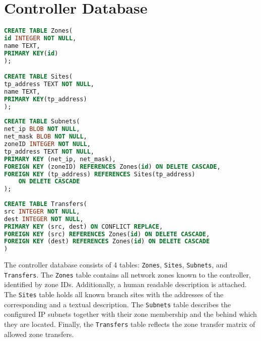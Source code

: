 \chapter{Controller Database}
\label{apdx:controllerdb}


\begin{lstlisting}[language=sql, basicstyle=\footnotesize,
]
CREATE TABLE Zones(
id INTEGER NOT NULL,
name TEXT,
PRIMARY KEY(id)
);

CREATE TABLE Sites(
tp_address TEXT NOT NULL,
name TEXT,
PRIMARY KEY(tp_address)
);
	  
CREATE TABLE Subnets(
net_ip BLOB NOT NULL,
net_mask BLOB NOT NULL,
zoneID INTEGER NOT NULL,
tp_address TEXT NOT NULL,
PRIMARY KEY (net_ip, net_mask),
FOREIGN KEY (zoneID) REFERENCES Zones(id) ON DELETE CASCADE,
FOREIGN KEY (tp_address) REFERENCES Sites(tp_address)
	ON DELETE CASCADE
);
	  
CREATE TABLE Transfers(
src INTEGER NOT NULL,
dest INTEGER NOT NULL,
PRIMARY KEY (src, dest) ON CONFLICT REPLACE,
FOREIGN KEY (src) REFERENCES Zones(id) ON DELETE CASCADE,
FOREIGN KEY (dest) REFERENCES Zones(id) ON DELETE CASCADE	
)
\end{lstlisting}

The controller database consists of 4 tables: \texttt{Zones}, \texttt{Sites}, \texttt{Subnets},
and \texttt{Transfers}. The \texttt{Zones} table contains all network zones known to the
controller, identified by zone IDs. Additionally, a human readable description is attached. The
\texttt{Sites} table holds all known branch sites with the addresses of the corresponding \tps
and a textual description. The \texttt{Subnets} table describes the configured IP subnets
together with their zone membership and the \tp behind which they are located. Finally, the
\texttt{Transfers} table reflects the zone transfer matrix of allowed zone transfers.
